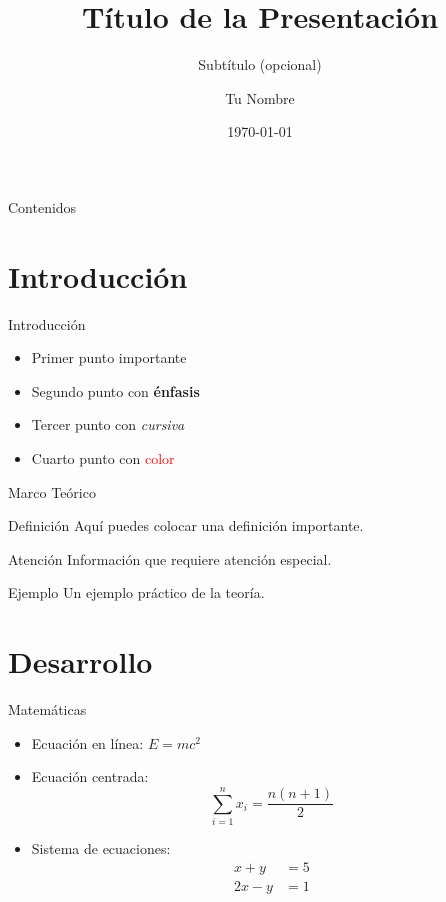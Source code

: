 \documentclass[aspectratio=169]{beamer}
\title{Título de la Presentación}
\subtitle{Subtítulo (opcional)}
\author{Tu Nombre}
\institute{Universidad/Institución}
\date{\today}
\begin{document}
\begin{frame}
    \titlepage
\end{frame}

\begin{frame}{Contenidos}
    \tableofcontents
\end{frame}

\section{Introducción}

\begin{frame}{Introducción}
    \begin{itemize}
        \item Primer punto importante
        \item Segundo punto con \textbf{énfasis}
        \item Tercer punto con \textit{cursiva}
        \item Cuarto punto con \textcolor{red}{color}
    \end{itemize}
\end{frame}

\begin{frame}{Marco Teórico}
    \begin{block}{Definición}
        Aquí puedes colocar una definición importante.
    \end{block}
    
    \begin{alertblock}{Atención}
        Información que requiere atención especial.
    \end{alertblock}
    
    \begin{exampleblock}{Ejemplo}
        Un ejemplo práctico de la teoría.
    \end{exampleblock}
\end{frame}

\section{Desarrollo}

\begin{frame}{Matemáticas}
    \begin{itemize}
        \item Ecuación en línea: $E = mc^2$
        \item Ecuación centrada:
        \begin{equation}
            \sum_{i=1}^{n} x_i = \frac{n(n+1)}{2}
        \end{equation}
        \item Sistema de ecuaciones:
        \begin{align}
            x + y &= 5 \\
            2x - y &= 1
        \end{align}
    \end{itemize}
\end{frame}
\end{document}
